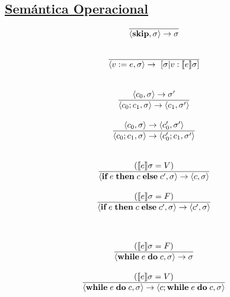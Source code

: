     \subsection*{\underline{Semántica Operacional}}
      \begin{multicols}{2}
        \[\begin{array}{cll}
          \overline{\lang{\skipp, \sigma} \rightarrow \sigma} \\ \\ \\
          
          \overline{\lang{v := e, \sigma} \rightarrow [\sigma | v : \semsAGU{e}]} \\ \\ \\
          
          \lang{c_0, \sigma} \rightarrow \sigma' \\
          \overline{\lang{c_0;c_1, \sigma} \rightarrow \lang{c_1, \sigma'}} \\ \\
          \lang{c_0, \sigma} \rightarrow \lang{c'_0, \sigma'} \\
          \overline{\lang{c_0;c_1, \sigma} \rightarrow \lang{c'_0; c_1, \sigma'}} \\ \\ \\

          (\semsAGU{e} = V) \\
          \overline{\lang{\ifthenelse{e}{c}{c'}, \sigma} \rightarrow \lang{c, \sigma}} \\ \\
          (\semsAGU{e} = F) \\
          \overline{\lang{\ifthenelse{e}{c}{c'}, \sigma} \rightarrow \lang{c', \sigma}} \\ \\ \\
        \end{array}\]

        \[\begin{array}{cll}
          (\llbracket e\rrbracket \sigma = F) \\
          \overline{\langle\textbf{while}\;e\;\textbf{do}\;c, \sigma\rangle \rightarrow \sigma} \\ \\
          (\llbracket e\rrbracket \sigma = V) \\
          \overline{\langle\textbf{while}\;e\;\textbf{do}\;c, \sigma\rangle \rightarrow \langle c; \textbf{while}\;e\;\textbf{do}\;c, \sigma\rangle} \\ \\ \\


\end{array}\]
\end{multicols}
